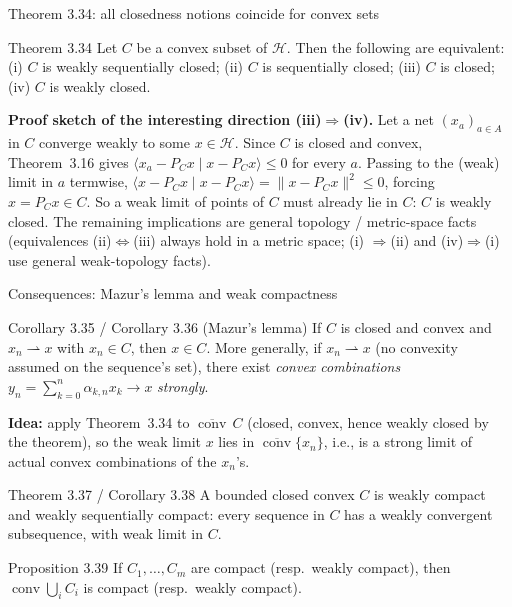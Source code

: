 \documentclass[aspectratio=169,10pt]{beamer}
\newcommand{\Hil}{\mathcal{H}}
\newcommand{\conv}{\operatorname{conv}}
\newcommand{\ip}[2]{\langle #1 \mid #2 \rangle}
\newcommand{\norm}[1]{\lVert #1 \rVert}
\newcommand{\PC}{P_C}
\begin{document}
\begin{frame}{Theorem 3.34: all closedness notions coincide for convex sets}
  \begin{block}{Theorem 3.34}
    Let $C$ be a convex subset of $\Hil$. Then the following are equivalent:
    (i) $C$ is weakly sequentially closed; (ii) $C$ is sequentially closed;
    (iii) $C$ is closed; (iv) $C$ is weakly closed.
  \end{block}
  \textbf{Proof sketch of the interesting direction (iii)$\Rightarrow$(iv).}
  Let a net $(x_a)_{a\in A}$ in $C$ converge weakly to some $x\in\Hil$. Since
  $C$ is closed and convex, Theorem~3.16 gives $\ip{x_a-\PC x}{x-\PC x}\le 0$
  for every $a$. Passing to the (weak) limit in $a$ termwise,
  $\ip{x-\PC x}{x-\PC x}=\norm{x-\PC x}^2\le 0$, forcing $x=\PC x\in C$. So a
  weak limit of points of $C$ must already lie in $C$: $C$ is weakly closed.
  The remaining implications are general topology / metric-space facts
  (equivalences (ii)$\Leftrightarrow$(iii) always hold in a metric space; (i)
  $\Rightarrow$(ii) and (iv)$\Rightarrow$(i) use general weak-topology facts).
\end{frame}

\begin{frame}{Consequences: Mazur's lemma and weak compactness}
  \begin{block}{Corollary 3.35 / Corollary 3.36 (Mazur's lemma)}
    If $C$ is closed and convex and $x_n\rightharpoonup x$ with $x_n\in C$,
    then $x\in C$. More generally, if $x_n \rightharpoonup x$ (no convexity
    assumed on the sequence's set), there exist \emph{convex combinations}
    $y_n = \sum_{k=0}^n \alpha_{k,n}x_k \to x$ \emph{strongly}.
  \end{block}
  \textbf{Idea:} apply Theorem~3.34 to $\overline{\conv}\,C$ (closed, convex,
  hence weakly closed by the theorem), so the weak limit $x$ lies in
  $\overline{\conv}\{x_n\}$, i.e., is a strong limit of actual convex
  combinations of the $x_n$'s.

  \begin{block}{Theorem 3.37 / Corollary 3.38}
    A bounded closed convex $C$ is weakly compact and weakly sequentially
    compact: every sequence in $C$ has a weakly convergent subsequence, with
    weak limit in $C$.
  \end{block}
  \begin{block}{Proposition 3.39}
    If $C_1,\dots,C_m$ are compact (resp.\ weakly compact), then
    $\conv\bigcup_{i} C_i$ is compact (resp.\ weakly compact).
  \end{block}
\end{frame}
\end{document}
